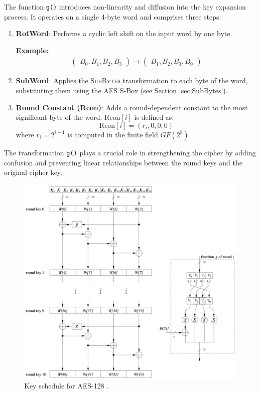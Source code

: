 The function \texttt{g()} introduces non-linearity and diffusion into the key expansion process. 
It operates on a single 4-byte word and comprises three steps:
\begin{enumerate}
    \item \textbf{RotWord}: Performs a cyclic left shift on the input word by one byte.
    
    \textbf{Example:}
    \begin{align}
        \begin{pmatrix}
            B_0, B_1, B_2, B_3
        \end{pmatrix}
        \rightarrow
        \begin{pmatrix}
            B_1, B_2, B_3, B_0
        \end{pmatrix}
    \end{align}

    \item \textbf{SubWord}: Applies the \textsc{SubBytes} transformation to each byte of the word, substituting them using the AES S-Box (see Section \ref{sec:SubBytes}).
    
    \item \textbf{Round Constant (Rcon)}: Adds a round-dependent constant to the most significant byte of the word. 
    $\text{Rcon}[i]$ is defined as:
    \begin{equation}
        \text{Rcon}[i] = (r_i, 0, 0, 0)
    \end{equation}
    where $r_i = 2^{i-1}$ is computed in the finite field $GF(2^8)$
\end{enumerate}

The transformation \texttt{g()} plays a crucial role in strengthening the cipher by adding confusion and preventing linear relationships between the round keys and the original cipher key.

\begin{figure}[!ht]
    \centering
    \includegraphics[width=\textwidth]{img/key-schedule-128.png}
    \caption{Key schedule for AES-128 \cite{Paar2024}.}
    \label{fig:key-schedule-128}
\end{figure}

